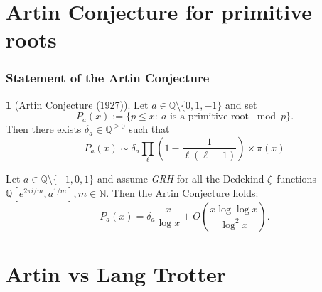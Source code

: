 \documentclass[10pt,handout]{beamer} %
\newcommand{\Q}{\mathbb Q}
\newcommand{\N}{\mathbb N}
\theoremstyle{definition}
\newtheorem{conj}[theorem]{\translate{Conjecture}}
\newtheorem{Note}[theorem]{\translate{Note}}
\begin{document}
\section{{Artin Conjecture for primitive roots}}
\begin{frame}
\frametitle{Statement of the Artin Conjecture}


\begin{conj}[\textcolor{red!70!black}{Artin Conjecture} (1927)]\pause Let $a\in\Q\setminus\{0,1,-1\}$ and set
$$P_a(x):=\{p\le x:\ a\text{ is a primitive root }\bmod p\}.$$
Then there exists $\delta_a\in\Q^{\ge0}$ such that
$$P_a(x)\sim\delta_a\prod_\ell\left(
1-\frac{1}{\ell(\ell-1)}\right)\times \pi(x)$$
\end{conj}\pause

\begin{theorem}[Hooley 1965] Let $a\in\Q\setminus\{-1,0,1\}$ and assume \emph{GRH} for all the Dedekind $\zeta$--functions
$\Q[e^{2\pi i/m},a^{1/m}], m\in\N$. Then the Artin Conjecture holds:\pause
$$P_a(x)=\delta_a\frac x{\log x}+O\left(\frac {x\log\log x}{\log^2 x}\right).$$
\end{theorem}


\end{frame}

\section{Artin vs Lang Trotter}
\end{document}
